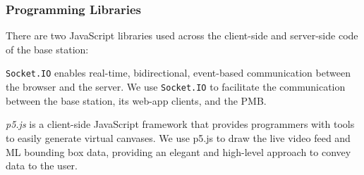 \subsubsection{Programming Libraries}

There are two JavaScript libraries used across the client-side and server-side code of the base station:

\texttt{Socket.IO} enables real-time, bidirectional, event-based communication between the browser and the server. We use \texttt{Socket.IO} to facilitate the communication between the base station, its web-app clients, and the PMB. 

\textit{p5.js} is a client-side JavaScript framework that provides programmers with tools to easily generate virtual canvases. We use p5.js to draw the live video feed and ML bounding box data, providing an elegant and high-level approach to convey data to the user.
